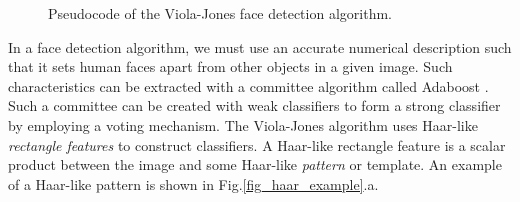 \documentclass[conference]{IEEEtran}
\begin{document}
\begin{figure}[!htb]
\begin{center}
\end{center}
\caption{Pseudocode of the Viola-Jones face detection algorithm.}
\label{fig_vj_pseudocode}
\end{figure}



In a face detection algorithm, we must use an accurate numerical description such that it sets human faces apart from other objects in a given image.
Such characteristics can be extracted with a committee algorithm called Adaboost \cite{adaboost-1997}. Such a committee can be created with weak classifiers to form a strong classifier by employing a voting mechanism. The Viola-Jones algorithm \cite{viola-2001} uses Haar-like {\it rectangle features} to construct classifiers. 
A Haar-like rectangle feature is a scalar product between the image and some Haar-like {\it pattern} or template.  
An example of a Haar-like pattern is shown in Fig.\ref{fig_haar_example}.a.
\end{document}
